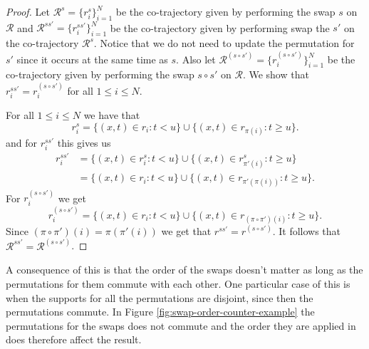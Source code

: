 \documentclass[12pt]{article}
\newcommand{\traj}{r}
\newcommand{\cotraj}{\mathcal{R}}
\newcommand{\swap}{s}
\theoremstyle{definition}
\begin{document}
\begin{proof}
  Let \(\cotraj^{\swap} = \{\traj^{\swap}_{i}\}_{i = 1}^{N}\) be the
  co-trajectory given by performing the swap \(\swap\) on \(\cotraj\)
  and
  \(\cotraj^{\swap\swap'} = \{\traj^{\swap\swap'}_{i}\}_{i = 1}^{N}\)
  be the co-trajectory given by performing swap the \(\swap'\) on the
  co-trajectory \(\cotraj^{\swap}\). Notice that we do not need to
  update the permutation for \(\swap'\) since it occurs at the same
  time as \(\swap\). Also let
  \(\cotraj^{(\swap \circ \swap')} = \{\traj^{(\swap \circ
    \swap')}_{i}\}_{i = 1}^{N}\) be the co-trajectory given by
  performing the swap \(\swap \circ \swap'\) on \(\cotraj\). We show
  that \(\traj^{\swap\swap'}_{i} = \traj^{(\swap \circ \swap')}_{i}\)
  for all \(1 \leq i \leq N\).

  For all \(1 \leq i \leq N\) we have that
  \begin{equation*}
    \traj^{\swap}_{i} = \{(x, t) \in \traj_{i}: t < u\}
    \cup \{(x, t) \in \traj_{\pi(i)}: t \geq u\}.
  \end{equation*}
  and for \(\traj^{\swap\swap'}_{i}\) this gives us
  \begin{align*}
    \traj^{\swap\swap'}_{i} & = \{(x, t) \in \traj^{\swap}_{i}: t < u\}
                              \cup \{(x, t) \in \traj^{\swap}_{\pi'(i)}: t \geq u\}\\
                            & = \{(x, t) \in \traj_{i}: t < u\}
                              \cup \{(x, t) \in \traj_{\pi'(\pi(i))}: t \geq u\}.
  \end{align*}
  For \(\traj^{(\swap \circ \swap')}_{i}\) we get
  \begin{equation*}
    \traj^{(\swap \circ \swap')}_{i} = \{(x, t) \in \traj_{i}: t < u\}
    \cup \{(x, t) \in \traj_{(\pi \circ \pi')(i)}: t \geq u\}.
  \end{equation*}
  Since \((\pi \circ \pi')(i) = \pi(\pi'(i))\) we get that
  \(\traj^{\swap\swap'} = \traj^{{(\swap \circ \swap')}}\). It follows
  that \(\cotraj^{\swap\swap'} = \cotraj^{(\swap \circ \swap')}\).
\end{proof}

A consequence of this is that the order of the swaps doesn't matter as
long as the permutations for them commute with each other. One
particular case of this is when the supports for all the permutations
are disjoint, since then the permutations commute. In Figure
\ref{fig:swap-order-counter-example} the permutations for the swaps
does not commute and the order they are applied in does therefore
affect the result.
\end{document}
